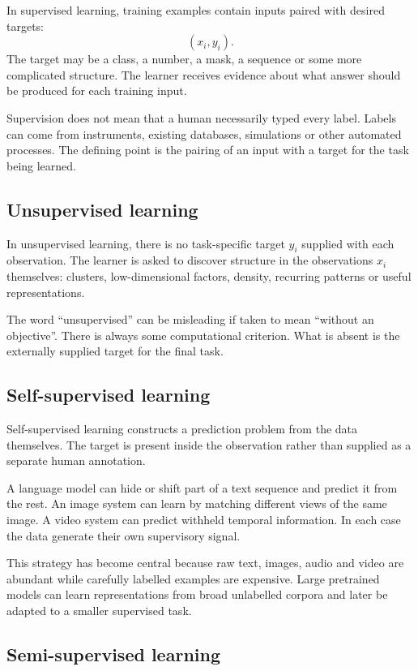 In supervised learning, training examples contain inputs paired with desired targets:
\[
  (x_i,y_i).
\]
The target may be a class, a number, a mask, a sequence or some more complicated structure. The learner receives evidence about what answer should be produced for each training input.

Supervision does not mean that a human necessarily typed every label. Labels can come from instruments, existing databases, simulations or other automated processes. The defining point is the pairing of an input with a target for the task being learned.

\subsection{Unsupervised learning}

In unsupervised learning, there is no task-specific target \(y_i\) supplied with each observation. The learner is asked to discover structure in the observations \(x_i\) themselves: clusters, low-dimensional factors, density, recurring patterns or useful representations.

The word ``unsupervised'' can be misleading if taken to mean ``without an objective''. There is always some computational criterion. What is absent is the externally supplied target for the final task.

\subsection{Self-supervised learning}

Self-supervised learning constructs a prediction problem from the data themselves. The target is present inside the observation rather than supplied as a separate human annotation.

A language model can hide or shift part of a text sequence and predict it from the rest. An image system can learn by matching different views of the same image. A video system can predict withheld temporal information. In each case the data generate their own supervisory signal.

This strategy has become central because raw text, images, audio and video are abundant while carefully labelled examples are expensive. Large pretrained models can learn representations from broad unlabelled corpora and later be adapted to a smaller supervised task.

\subsection{Semi-supervised learning}

